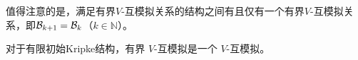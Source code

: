 值得注意的是，满足有界$V$-互模拟关系的结构之间有且仅有一个有界$V$-互模拟关系，即${\cal B}_{k+1} = {\cal B}_k$（$k \in \mathbb{N}$）。


\begin{lemma} \label{lem:HbBis}
	对于有限初始Kripke结构，有界 $V$-互模拟是一个 $V$-互模拟。
\end{lemma}

